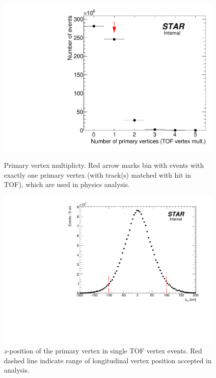 \begin{figure}[ht!]%
\centering%
\begin{minipage}{.4725\textwidth}%
  \centering%
  \includegraphics[width=\linewidth]{graphics/eventSelection/NumberOfPrimaryVertices.pdf}%
  \caption{Primary vertex multiplicty. Red arrow marks bin with events with exactly one primary vertex (with track(s) matched with hit in TOF), which are used in physics analysis.\newline}\label{fig:NumberOfPrimaryVertices}
\end{minipage}%
\quad\quad%
\begin{minipage}{.4725\textwidth}%
  \centering
  \includegraphics[width=\linewidth]{graphics/eventSelection/zVertex_oneTof.pdf}\newline\newline\newline%
  \caption{\texorpdfstring{$z$}{z}-position of the primary vertex in single TOF vertex events. Red dashed line indicate range of longitudinal vertex position accepted in analysis.}\label{fig:zVertexTpc}
\end{minipage}%
\end{figure}%


